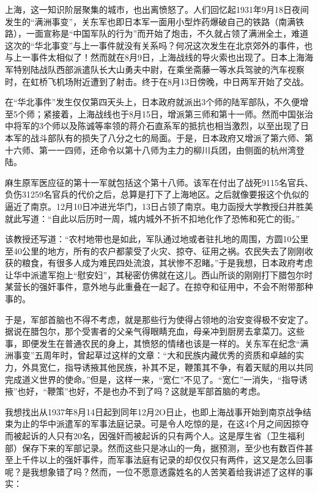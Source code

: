 \documentclass[12pt,UTF8]{ctexbook}
\begin{document}
上海，这一知识阶层聚集的城市，也出离愤怒了。人们回忆起1931年9月18日夜间发生的“满洲事变”，关东军也即日本军一面用小型炸药爆破自己的铁路（南满铁路），一面宣称是“中国军队的行为”而开始了炮击，不久就占领了满洲全土，难道这次的“华北事变”与上一事件就没有关系吗？何况这次发生在北京郊外的事件，也与上一事件太相似了！然而就在8月9日，上海战线的导火索也出现了。日本上海海军特别陆战队西部派遣队长大山勇夫中尉，在乘坐斋藤一等水兵驾驶的汽车视察时，在虹桥飞机场附近遭到了射击。终于在8月13日傍晚，中日两军开始了交战。

在“华北事件”发生仅仅第四天头上，日本政府就派出3个师的陆军部队，不久便增至5个师；紧接着，上海战线也于8月15日，增派第三师和第十一师。然而中国张治中将军的3个师以及陈诚等率领的蒋介石直系军的抵抗也相当激烈，以至出现了日本军的战斗部队有的损失了八分之七的局面。于是，日本政府又增派了第六师、第十六师、第一一四师，还命令以第十八师为主力的柳川兵团，由侧面的杭州湾登陆。

麻生原军医应征的第十一军就包括这个第十八师。该军在付出了战死9115名官兵、负伤31259名官兵的代价之后，总算是打下了上海地区。之后就像要报这个仇似的逼近了南京。12月10日冲进光华门，13日占领了南京。电力函授大学教授臼井胜美就此写道：“自此以后历时一周，城内城外不折不扣地化作了恐怖和死亡的街。”

该教授还写道：“农村地带也是如此，军队通过地或者驻扎地的周围，方圆10公里至40公里的地方，所有的农户都蒙受了火灾、掠夺、征用之祸。农民失去了刚刚收获的粮食，有很多人成为难民四处流浪，其状惨不忍睹。”于是我想，日本政府考虑让华中派遣军抱上“慰安妇”，其秘密仿佛就在这儿。西山所谈的刚刚打下腊包尔时某营长的强奸事件，意外地与此重叠在一起了。在掠夺和征用中，不会不附带那种事的。

于是，军部首脑也不得不考虑，就是那些行为使得占领地的治安变得极不安定了。据说在腊包尔，那个受害者的父亲气得眼睛充血，母亲冲到厨房去拿菜刀。这些事，即便发生在普通农民的身上，其愤怒的情绪也该是一样的。关东军在纪念“满洲事变”五周年时，曾起草过这样的文章：“大和民族内藏优秀的资质和卓越的实力，外具宽仁，指导诱掖其他民族，补其不足，鞭策其不争，有着天赋的用以共同完成道义世界的使命。”但是，这样一来，“宽仁”不见了。“宽仁”一消失，“指导诱掖”也好，“鞭策”也好，不是也办不到了吗？这就是军部首脑的考虑。

我想找出从1937年8月14日起到同年12月2O日止，也即上海战事开始到南京战争结束为止的华中派遣军的军事法庭记录。可是令人吃惊的是，在这4个月之间因掠夺而被起诉的人只有20名，因强奸而被起诉的只有两个人。这是厚生省（卫生福利部）保存下来的军部记录。然而这些只是冰山的一角，据预测，至少也有数百件甚至上千件以上的强奸事件，而军事法庭有记录的却仅仅只有两件，这又是怎么回事呢？是我想象错了吗？然而，一位不愿意透露姓名的人苦笑着给我讲述了这样的事实：
\end{document}
